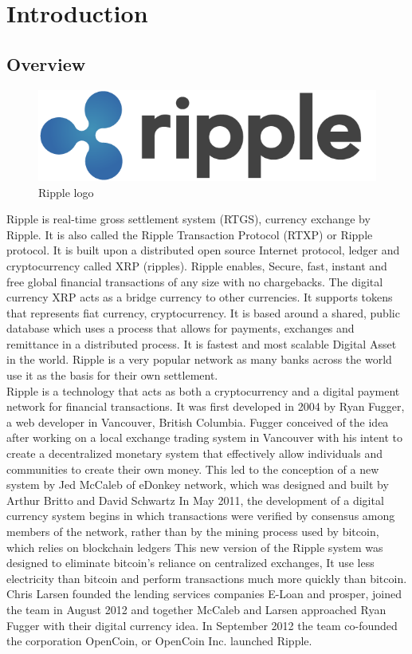 \chapter{Introduction}


\section{Overview}
\begin{figure}[H] 
	\centering \includegraphics[scale=0.31]{images/ripple.png}
	\caption{Ripple logo}
	\label{fig:ripplelogo}
\end{figure}
\noindent Ripple is real-time gross settlement system (RTGS), currency exchange by Ripple. It is also called the Ripple Transaction Protocol (RTXP) or Ripple protocol. It is built upon a distributed open source Internet protocol, ledger and  cryptocurrency called XRP (ripples). Ripple enables, Secure, fast, instant and free global financial transactions of any size with no chargebacks. The digital currency XRP acts as a bridge currency to other currencies. It supports tokens that represents fiat currency, cryptocurrency. It is based around a shared, public database which uses a process that allows for payments, exchanges and remittance in a distributed process. It is fastest and most scalable Digital Asset in the world. Ripple is a very popular network as many banks across the world use it as the basis for their own settlement. \\

\noindent Ripple is a technology that acts as both a cryptocurrency and a digital payment network for financial transactions. It was first developed in 2004 by Ryan Fugger, a  web developer in Vancouver, British Columbia. Fugger conceived of the idea after working on a local exchange trading system in Vancouver with his intent to create a decentralized monetary system that effectively allow individuals and communities to create their own money. This led to the conception of a new system by Jed McCaleb of eDonkey network, which was designed and built by Arthur Britto and David Schwartz In May 2011, the development of a digital currency system begins in which transactions were verified by consensus among members of the network, rather than by the mining process used by bitcoin, which relies on blockchain ledgers This new version of the Ripple system was designed to eliminate bitcoin's reliance on centralized exchanges, It use less electricity than bitcoin and perform transactions much more quickly than bitcoin. Chris Larsen founded the lending services companies E-Loan and prosper, joined the team in August 2012  and together McCaleb and Larsen approached Ryan Fugger with their digital currency idea. In September 2012 the team co-founded the corporation OpenCoin, or OpenCoin Inc. launched Ripple. \\ 



